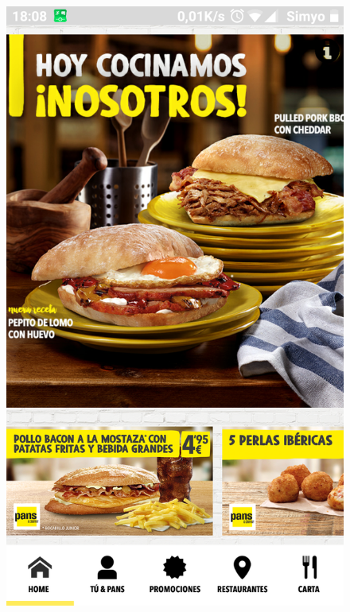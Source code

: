 \documentclass[twoside]{report}
\begin{document}
\begin{figure}[H]
\begin{center}
\includegraphics[scale=0.10]{images/restaurantes/pans0.png}

\end{center}
\end{figure}
\end{document}
